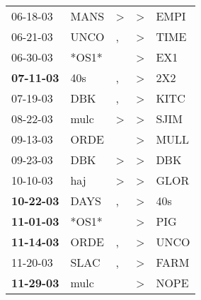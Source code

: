 \begin{supertabular}{p{0.07\textwidth}p{0.06\textwidth}p{0.02\textwidth}p{0.02\textwidth}p{0.06\textwidth}}
          06-18-03\textsuperscript{} &           MANS\textsuperscript{} &     \textgreater &     \textgreater &           EMPI\textsuperscript{} \\
          06-21-03\textsuperscript{} &           UNCO\textsuperscript{} &                , &     \textgreater &           TIME\textsuperscript{} \\
          06-30-03\textsuperscript{} &                            *OS1* &                  &     \textgreater &            EX1\textsuperscript{} \\
 \textbf{07-11-03\textsuperscript{}} &            40s\textsuperscript{} &                , &     \textgreater &            2X2\textsuperscript{} \\
          07-19-03\textsuperscript{} &            DBK\textsuperscript{} &                , &     \textgreater &           KITC\textsuperscript{} \\
          08-22-03\textsuperscript{} &           mulc\textsuperscript{} &     \textgreater &     \textgreater &           SJIM\textsuperscript{} \\
          09-13-03\textsuperscript{} &           ORDE\textsuperscript{} &                  &     \textgreater &           MULL\textsuperscript{} \\
          09-23-03\textsuperscript{} &            DBK\textsuperscript{} &     \textgreater &     \textgreater &            DBK\textsuperscript{} \\
          10-10-03\textsuperscript{} &            haj\textsuperscript{} &     \textgreater &     \textgreater &           GLOR\textsuperscript{} \\
 \textbf{10-22-03\textsuperscript{}} &           DAYS\textsuperscript{} &                , &     \textgreater &            40s\textsuperscript{} \\
 \textbf{11-01-03\textsuperscript{}} &                            *OS1* &                  &     \textgreater &            PIG\textsuperscript{} \\
 \textbf{11-14-03\textsuperscript{}} &           ORDE\textsuperscript{} &                , &     \textgreater &           UNCO\textsuperscript{} \\
          11-20-03\textsuperscript{} &           SLAC\textsuperscript{} &                , &     \textgreater &           FARM\textsuperscript{} \\
 \textbf{11-29-03\textsuperscript{}} &           mulc\textsuperscript{} &                  &     \textgreater &           NOPE\textsuperscript{} \\

\end{supertabular}
